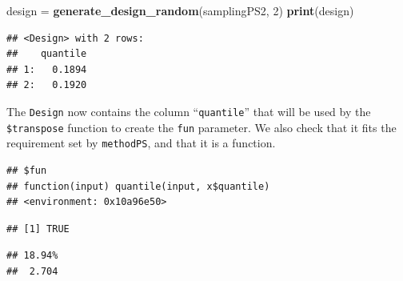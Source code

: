 \documentclass[]{article}
\newenvironment{Shaded}{\begin{snugshade}}{\end{snugshade}}
\newcommand{\DecValTok}[1]{\textcolor[rgb]{0.00,0.00,0.81}{#1}}
\newcommand{\KeywordTok}[1]{\textcolor[rgb]{0.13,0.29,0.53}{\textbf{#1}}}
\newcommand{\NormalTok}[1]{#1}
\newcommand{\OperatorTok}[1]{\textcolor[rgb]{0.81,0.36,0.00}{\textbf{#1}}}
\newcommand{\StringTok}[1]{\textcolor[rgb]{0.31,0.60,0.02}{#1}}
\renewenvironment{Shaded} {\begin{snugshade}\small} {\end{snugshade}}
\begin{document}
\begin{Shaded}
\begin{Highlighting}[]
\NormalTok{design =}\StringTok{ }\KeywordTok{generate_design_random}\NormalTok{(samplingPS2, }\DecValTok{2}\NormalTok{)}
\KeywordTok{print}\NormalTok{(design)}
\end{Highlighting}
\end{Shaded}

\begin{verbatim}
## <Design> with 2 rows:
##    quantile
## 1:   0.1894
## 2:   0.1920
\end{verbatim}

The \texttt{Design} now contains the column ``\texttt{quantile}'' that will be used by the \texttt{\$transpose} function to create the \texttt{fun} parameter.
We also check that it fits the requirement set by \texttt{methodPS}, and that it is a function.

\begin{Shaded}
\end{Shaded}

\begin{verbatim}
## $fun
## function(input) quantile(input, x$quantile)
## <environment: 0x10a96e50>
\end{verbatim}

\begin{Shaded}
\end{Shaded}

\begin{verbatim}
## [1] TRUE
\end{verbatim}

\begin{Shaded}
\end{Shaded}

\begin{verbatim}
## 18.94% 
##  2.704
\end{verbatim}
\end{document}
